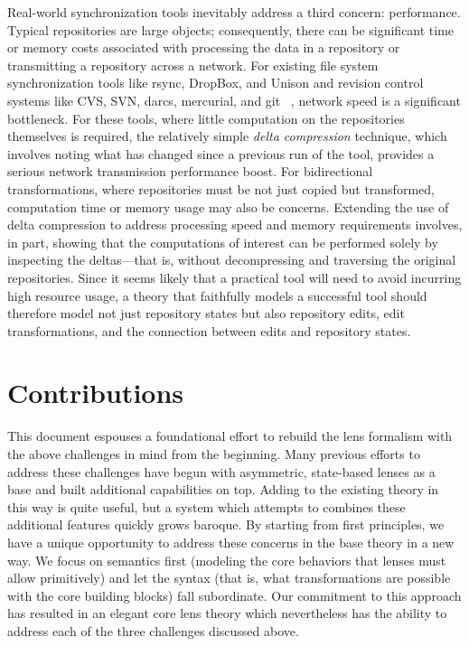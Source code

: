 Real-world synchronization tools inevitably address a third concern:
performance. Typical repositories are large objects; consequently, there can
be significant time or memory costs associated with processing the data in a
repository or transmitting a repository across a network. For existing file
system synchronization tools like rsync, DropBox, and Unison and revision
control systems like CVS, SVN, darcs, mercurial, and git~%
\cite{Tridgell96rsync,dropbox,pierce2004unison,berliner1990cvs,subversion,darcs,mercurial,git},
network speed is a significant bottleneck. For these tools, where little
computation on the repositories themselves is required, the relatively
simple \emph{delta compression} technique, which involves noting what has
changed since a previous run of the tool, provides a serious network
transmission performance boost. For bidirectional transformations, where
repositories must be not just copied but transformed, computation time or
memory usage may also be concerns. Extending the use of delta compression to
address processing speed and memory requirements involves, in part, showing
that the computations of interest can be performed solely by inspecting the
deltas---that is, without decompressing and traversing the original
repositories. Since it seems likely that a practical tool will need to avoid
incurring high resource usage, a theory that faithfully models a successful
tool should therefore model not just repository states but also repository
edits, edit transformations, and the connection between edits and repository
states.

\section{Contributions}
\label{sec:intro-contributions}
This document espouses a foundational effort to rebuild the lens formalism
with the above challenges in mind from the beginning. Many previous efforts
to address these challenges have begun with asymmetric, state-based lenses
as a base and built additional capabilities on top. Adding to the existing
theory in this way is quite useful, but a system which attempts to combines
these additional features quickly grows baroque. By starting from first
principles, we have a unique opportunity to address these concerns in the
base theory in a new way. We focus on semantics first (modeling the core
behaviors that lenses must allow primitively) and let the syntax (that is,
what transformations are possible with the core building blocks) fall
subordinate. Our commitment to this approach has resulted in an elegant core
lens theory which nevertheless has the ability to address each of the three
challenges discussed above.

